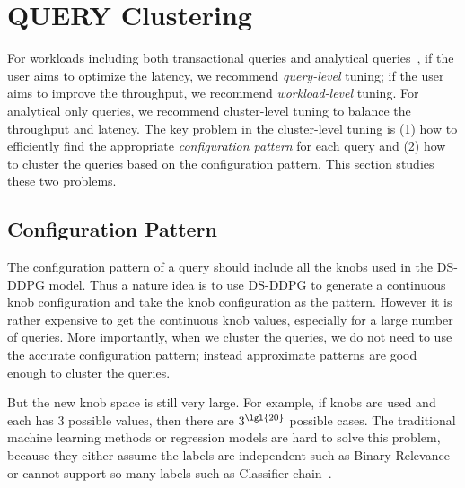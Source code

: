 
\section{QUERY Clustering}
\label{sec:cluster}

For workloads including both transactional queries and analytical queries~\cite{DBLP:conf/icde/OhL05}, if the user aims to optimize the latency, we recommend  {\it query-level} tuning; if the user aims to improve the throughput, we recommend  {\it workload-level} tuning. For analytical only queries, we recommend cluster-level tuning to balance the throughput and latency. The key problem in the cluster-level tuning is (1) how to efficiently find the appropriate {\it configuration pattern} for each query and (2) how to cluster the queries based on the configuration pattern.  This section studies these two problems. %


\subsection{Configuration Pattern}
\label{sec:pattern}
The configuration pattern of a query should include all the knobs used in the DS-DDPG model. Thus a nature idea is to use DS-DDPG to generate a continuous knob configuration and take the knob configuration as the pattern. However it is rather expensive to get the continuous knob values, especially for a large number of queries. More importantly, when we cluster the queries, we do not need to use the accurate configuration pattern; instead approximate patterns are good enough to cluster the queries. 


 But the new knob space is still very large. For example, if  knobs are used and each has 3 possible values, then there are $3^{\lgl{20}}$ possible cases. The traditional machine learning methods or regression models are hard  to solve this problem, because they either assume the labels are independent such as Binary Relevance~\cite{DBLP:journals/pai/LuacesDBCB12} or cannot support so many labels such as Classifier chain~\cite{DBLP:journals/ml/ReadPHF11}. 



